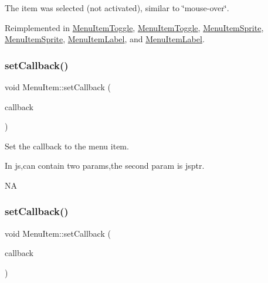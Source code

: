 The item was selected (not activated), similar to \char`\"{}mouse-\/over\char`\"{}. 

Reimplemented in \hyperlink{classMenuItemToggle_ad10d606528c3625314bf75e5db442bf4}{Menu\+Item\+Toggle}, \hyperlink{classMenuItemToggle_ab9a7783e4ba3ed0d8636ea77424f7aab}{Menu\+Item\+Toggle}, \hyperlink{classMenuItemSprite_ab48a29704c139512abfb0835fecfa087}{Menu\+Item\+Sprite}, \hyperlink{classMenuItemSprite_a668b5d916cb926e161cc7ebdf96364e6}{Menu\+Item\+Sprite}, \hyperlink{classMenuItemLabel_a7c274195091bece411d64330754ea2e2}{Menu\+Item\+Label}, and \hyperlink{classMenuItemLabel_aabdccb0d37847efa1a0ba0f717dcee30}{Menu\+Item\+Label}.

\mbox{\label{classMenuItem_a313b2ac1d809dea921aacc47ad8aef0f}} 
\subsubsection{\texorpdfstring{set\+Callback()}{setCallback()}\hspace{0.1cm}{\footnotesize\ttfamily [1/2]}}
{\footnotesize\ttfamily void Menu\+Item\+::set\+Callback (\begin{DoxyParamCaption}\item[{const cc\+Menu\+Callback \&}]{callback }\end{DoxyParamCaption})}

Set the callback to the menu item. 
\begin{DoxyCode}
In js,can contain two params,the second param is jsptr.
\end{DoxyCode}
  NA \mbox{\label{classMenuItem_a313b2ac1d809dea921aacc47ad8aef0f}} 
\subsubsection{\texorpdfstring{set\+Callback()}{setCallback()}\hspace{0.1cm}{\footnotesize\ttfamily [2/2]}}
{\footnotesize\ttfamily void Menu\+Item\+::set\+Callback (\begin{DoxyParamCaption}\item[{const cc\+Menu\+Callback \&}]{callback }\end{DoxyParamCaption})}

